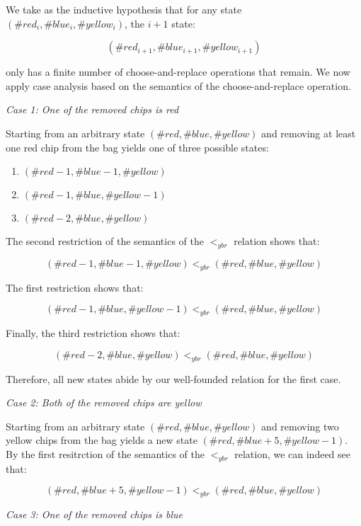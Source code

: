 \documentclass{article}
\begin{document}
\medskip
\noindent We take as the inductive hypothesis that for any state $(\#red_i, \#blue_i, \#yellow_i)$, the $i + 1$ state:

$$(\#red_{i + 1}, \#blue_{i + 1}, \#yellow_{i + 1})$$

\noindent only has a finite number of choose-and-replace operations that remain. We now apply case analysis based on the semantics of the choose-and-replace operation.

\medskip
\noindent \emph{Case 1: One of the removed chips is red}

\medskip
\noindent Starting from an arbitrary state $(\#red, \#blue, \#yellow)$ and removing at least one red chip from the bag yields one of three possible states:

\begin{enumerate}
  \item $(\#red - 1, \#blue - 1, \#yellow)$
  \item $(\#red - 1, \#blue, \#yellow - 1)$
  \item $(\#red - 2, \#blue, \#yellow)$
\end{enumerate}

\noindent The second restriction of the semantics of the $<_{ybr}$ relation shows that:

$$
(\#red - 1, \#blue - 1, \#yellow) <_{ybr} (\#red, \#blue, \#yellow)
$$

\noindent The first restriction shows that:

$$
(\#red - 1, \#blue, \#yellow - 1) <_{ybr} (\#red, \#blue, \#yellow)
$$

\noindent Finally, the third restriction shows that:

$$
(\#red - 2, \#blue, \#yellow) <_{ybr} (\#red, \#blue, \#yellow)
$$

\noindent Therefore, all new states abide by our well-founded relation for the first case.

\medskip
\noindent \emph{Case 2: Both of the removed chips are yellow}

\medskip
\noindent Starting from an arbitrary state $(\#red, \#blue, \#yellow)$ and removing two yellow chips from the bag yields a new state $(\#red, \#blue + 5, \#yellow - 1)$. By the first resitrction of the semantics of the $<_{ybr}$ relation, we can indeed see that:

$$
(\#red, \#blue + 5, \#yellow - 1) <_{ybr} (\#red, \#blue, \#yellow)
$$

\medskip
\noindent \emph{Case 3: One of the removed chips is blue}
\end{document}
